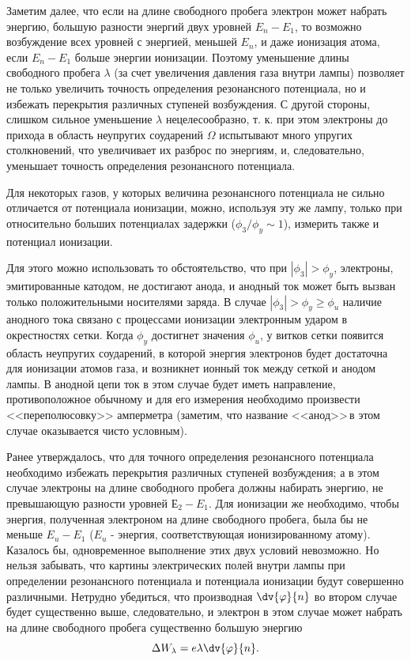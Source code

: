 Заметим далее, что если на длине свободного пробега электрон может набрать энергию, большую разности энергий двух уровней $E_n-E_1$, то возможно возбуждение всех уровней с
энергией, меньшей $E_n$, и даже ионизация атома, если $E_n-E_1$ больше энергии ионизации. Поэтому уменьшение длины свободного пробега $\lambda$ (за счет увеличения давления газа внутри лампы) позволяет не только увеличить точность определения резонансного потенциала, но и избежать перекрытия различных ступеней возбуждения. С другой стороны, слишком сильное уменьшение $\lambda$ нецелесообразно, т. к. при этом электроны до прихода в область неупругих соударений $\Omega$ испытывают много упругих столкновений, что увеличивает их разброс по энергиям, и, следовательно, уменьшает точность определения резонансного потенциала.

Для некоторых газов, у которых величина резонансного потенциала не сильно отличается от потенциала ионизации, можно, используя эту же лампу, только при относительно больших потенциалах задержки 
($\phi_{3} /\phi_{y} \sim1$), измерить также и потенциал ионизации.

Для этого можно использовать то обстоятельство, что при 
$|\phi_{3}|>{\phi_{y}}$, электроны, эмитированные катодом, не достигают анода, и анодный ток может быть вызван только положительными носителями заряда. В случае $|\phi_{3}|>{\phi_{y}}\geqslant{\phi_{u}}$ наличие анодного тока связано с процессами ионизации электронным ударом в окрестностях сетки. Когда $\phi_{y}$ достигнет значения $\phi_{u}$, у витков сетки появится область неупругих соударений, в которой энергия электронов будет достаточна для ионизации атомов газа, и возникнет ионный ток между сеткой и анодом лампы. В анодной цепи ток в этом случае будет иметь направление, противоположное обычному и для его измерения необходимо произвести <<переполюсовку>> амперметра (заметим, что название <<анод>>\,в этом случае оказывается чисто условным).

Ранее утверждалось, что для точного определения резонансного потенциала необходимо избежать перекрытия различных ступеней возбуждения; а в этом случае электроны на длине свободного пробега должны набирать энергию, не превышающую разности уровней $\text{Е}_{2}-E_{1}$. Для ионизации же необходимо, чтобы энергия, полученная электроном на длине свободного пробега, была бы не меньше $E_{u}-E_1$ ($E_{u}$ - энергия, соответствующая ионизированному атому). Казалось бы, одновременное выполнение этих двух условий невозможно. Но нельзя забывать, что картины электрических полей внутри лампы при определении резонансного потенциала и потенциала ионизации будут совершенно различными. Нетрудно убедиться, что производная $\displaystyle\dv{\phi}{n}$ во втором случае будет существенно выше, следовательно, и электрон в этом случае может набрать на длине свободного пробега существенно большую энергию $$\Delta W_{\lambda}=e\lambda \displaystyle\dv{\phi}{n}.$$

